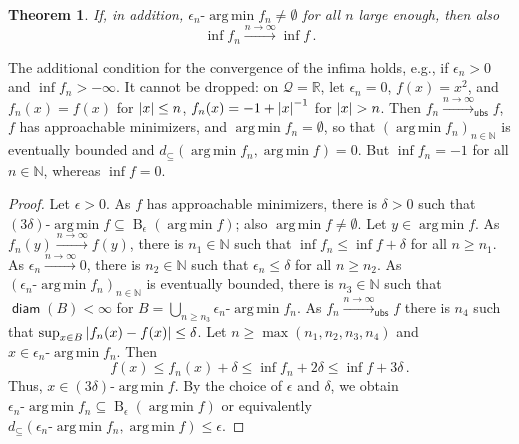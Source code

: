 \documentclass{scrartcl}
\renewcommand{\subset}{\subseteq}
\DeclareMathOperator{\diam}{\mathsf{diam}}
\DeclareMathOperator{\ball}{\mathrm{B}}
\newcommand{\N}{\mathbb{N}}
\newcommand{\R}{\mathbb{R}}
\newcommand{\equationFullstop}{\, .}
\newcommand{\eqfs}{\equationFullstop}
\DeclareMathOperator*{\argmin}{arg\,min}
\def\MS{\mathcal{Q}}\def\epi{\mathsf{epi}}\def\aec{\mathsf{aec}}\def\alsec{\mathsf{alsec}}\def\aecp{\mathsf{aec}_P}\def\Hausdorff{\mathsf{H}}\def\Haus{\mathsf{H}}\def\ubs{\mathsf{ubs}}\newcommand{\epiconv}[1]{\xrightarrow{#1\to\infty}_\epi}\newcommand{\hausconv}[1]{\xrightarrow{#1\to\infty}_\Hausdorff}\newcommand{\ubsconv}[1]{\xrightarrow{#1\to\infty}_\ubs}\newcommand{\ol}[2]{\overline{#1,\!#2}}
\theoremstyle{plain}\newtheorem{theorem}{Theorem}[section]
\theoremstyle{definition}
\theoremstyle{remark}
\begin{document}
\begin{appendix}
\begin{theorem}
	If, in addition, $\epsilon_n\text{-}\argmin f_n \neq \emptyset$ for all $n$ large enough, then also
	\begin{equation*}
		\inf f_n \xrightarrow{n\to\infty} \inf f
		\eqfs
	\end{equation*}
\end{theorem}
The additional condition for the convergence of the infima holds, e.g., if $\epsilon_n > 0$ and $\inf f_n > -\infty$. It cannot be dropped: on $\MS = \R$, let $\epsilon_n = 0$, $f(x) = x^2$, and $f_n(x) = f(x)$ for $\left| x \right| \leq n$, $f_n(x) = -1 + \left| x \right|^{-1}$ for $\left| x \right| > n$. Then $f_n\ubsconv{n}f$, $f$ has approachable minimizers, and $\argmin f_n = \emptyset$, so that $(\argmin f_n)_{n\in\N}$ is eventually bounded and $d_\subset(\argmin f_n, \argmin f) = 0$. But $\inf f_n = -1$ for all $n\in\N$, whereas $\inf f = 0$.
\begin{proof}
		Let $\epsilon >0$. As $f$ has approachable minimizers, there is $\delta > 0$ such that $(3\delta)\text{-}\argmin f \subset \ball_\epsilon(\argmin f)$; also $\argmin f \neq \emptyset$. Let $y\in\argmin f$. As $f_n(y) \xrightarrow{n\to\infty} f(y)$, there is $n_1\in\N$ such that $\inf f_n \leq \inf f + \delta$ for all $n \geq n_1$.		
		As $\epsilon_n \xrightarrow{n\to\infty} 0$, there is $n_2\in\N$ such that $\epsilon_n \leq \delta$ for all $n \geq n_2$.
		As $(\epsilon_n\text{-}\argmin f_n)_{n\in\N}$ is eventually bounded, there is $n_3\in\N$ such that $\diam(B) < \infty$ for $B = \bigcup_{n\geq n_3} \epsilon_n\text{-}\argmin f_n$.
		As $f_n \xrightarrow{n\to\infty}_{\ubs} f$ there is $n_4$ such that $\sup_{x\in B}\left| f_n(x) - f(x) \right| \leq \delta$.
		Let $n \geq \max(n_1, n_2, n_3, n_4)$ and $x \in \epsilon_n\text{-}\argmin f_n$. Then
		\begin{equation*}
			f(x) \leq f_n(x) + \delta \leq \inf f_n + 2\delta \leq \inf f + 3\delta\eqfs
		\end{equation*}
		Thus, $x \in (3\delta)\text{-}\argmin f$. By the choice of $\epsilon$ and $\delta$, we obtain $\epsilon_n\text{-}\argmin f_n \subset \ball_\epsilon(\argmin f)$ or equivalently $d_{\subset}(\epsilon_n\text{-}\argmin f_n, \argmin f) \leq \epsilon$.
		

\end{proof}
\end{appendix}
\end{document}
